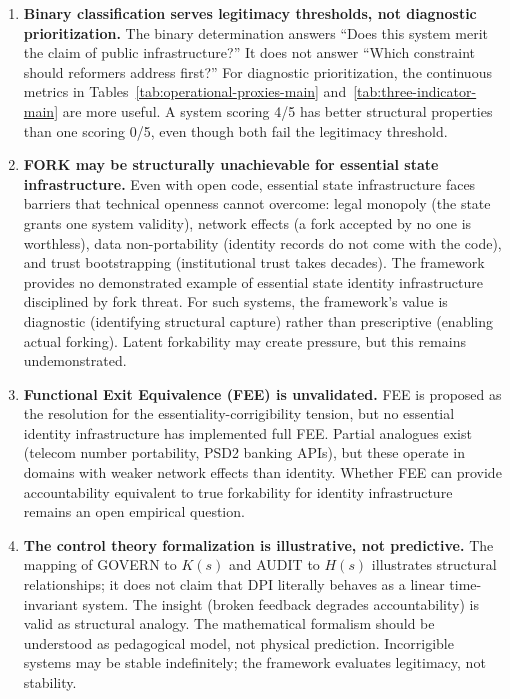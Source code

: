 \documentclass{article}
\begin{document}
\begin{enumerate}
    \item \textbf{Binary classification serves legitimacy thresholds, not diagnostic prioritization.} The binary determination answers ``Does this system merit the claim of public infrastructure?'' It does not answer ``Which constraint should reformers address first?'' For diagnostic prioritization, the continuous metrics in Tables~\ref{tab:operational-proxies-main} and~\ref{tab:three-indicator-main} are more useful. A system scoring 4/5 has better structural properties than one scoring 0/5, even though both fail the legitimacy threshold.

    \item \textbf{FORK may be structurally unachievable for essential state infrastructure.} Even with open code, essential state infrastructure faces barriers that technical openness cannot overcome: legal monopoly (the state grants one system validity), network effects (a fork accepted by no one is worthless), data non-portability (identity records do not come with the code), and trust bootstrapping (institutional trust takes decades). The framework provides no demonstrated example of essential state identity infrastructure disciplined by fork threat. For such systems, the framework's value is diagnostic (identifying structural capture) rather than prescriptive (enabling actual forking). Latent forkability may create pressure, but this remains undemonstrated.

    \item \textbf{Functional Exit Equivalence (FEE) is unvalidated.} FEE is proposed as the resolution for the essentiality-corrigibility tension, but no essential identity infrastructure has implemented full FEE. Partial analogues exist (telecom number portability, PSD2 banking APIs), but these operate in domains with weaker network effects than identity. Whether FEE can provide accountability equivalent to true forkability for identity infrastructure remains an open empirical question.

    \item \textbf{The control theory formalization is illustrative, not predictive.} The mapping of GOVERN to $K(s)$ and AUDIT to $H(s)$ illustrates structural relationships; it does not claim that DPI literally behaves as a linear time-invariant system. The insight (broken feedback degrades accountability) is valid as structural analogy. The mathematical formalism should be understood as pedagogical model, not physical prediction. Incorrigible systems may be stable indefinitely; the framework evaluates legitimacy, not stability.


\end{enumerate}
\end{document}
